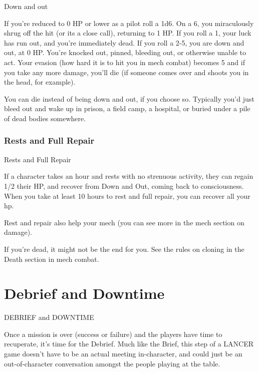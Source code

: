                                                  Down and out 

                                                                                                                 


If you’re reduced to 0 HP or lower as a pilot roll a 1d6. On a 6, you miraculously shrug off the hit  
(or its a close call), returning to 1 HP. If you roll a 1, your luck has run out, and you’re immediately  
dead. If you roll a 2-5, you are down and out, at 0 HP. You’re knocked out, pinned, bleeding out,  
or otherwise unable to act. Your evasion (how hard it is to hit you in mech combat) becomes 5  
and if you take any more damage, you’ll die (if someone comes over and shoots you in the head,  
for example).
 

You can die instead of being down and out, if you choose so. Typically you’d just bleed out and  
wake up in prison, a field camp, a hospital, or buried under a pile of dead bodies somewhere.
 
\subsection{Rests and Full Repair}

                                         Rests and Full Repair  

If a character takes an hour and rests with no strenuous activity, they can regain 1/2 their HP, and  
recover from Down and Out, coming back to consciousness. When you take at least 10 hours to  
rest and full repair, you can recover all your hp.
 

Rest and repair also help your mech (you can see more in the mech section on damage).
 

If you’re dead, it might not be the end for you. See the rules on cloning in the Death section in  
mech combat.
  
\chapter{Debrief and Downtime}

                      DEBRIEF and DOWNTIME
 

Once a mission is over (success or failure) and the players have time to recuperate, it’s time for  
the Debrief. Much like the Brief, this step of a LANCER game doesn’t have to be an actual  
meeting in-character, and could just be an out-of-character conversation amongst the people  
playing at the table. 
 

